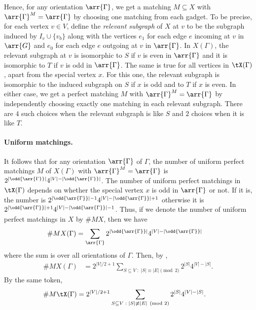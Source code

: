 \documentclass{toc}
\begin{document}
Hence, for any orientation $\arr{\Gamma}$, we get a matching $M \subseteq X$ with
$\arr{\Gamma}^M = \arr{\Gamma}$ by choosing one matching from each gadget. To be precise,
for each vertex $v \in V$, define the \emph{relevant subgraph} of $X$ at $v$ to
be the subgraph induced by $I_v \cup \{v_b\}$ along with the vertices $e_1$ for
each edge $e$ incoming at $v$ in $\arr{G}$ and $e_0$ for each edge $e$ outgoing
at $v$ in $\arr{\Gamma}$. In $X(\Gamma)$, the relevant subgraph at $v$ is isomorphic to
$S$ if $v$ is even in $\arr{\Gamma}$ and it is isomorphic to $T$ if $v$ is odd in
$\arr{\Gamma}$. The same is true for all vertices in $\tX(\Gamma)$, apart from the special
vertex $x$. For this one, the relevant subgraph is isomorphic to the induced subgraph on $S$ if $x$ is
odd and to $T$ if $x$ is even. In either case, we get a perfect matching $M$
with $\arr{\Gamma}^M = \arr{\Gamma}$ by independently choosing exactly one matching in
each relevant subgraph. There are $4$ such choices when the relevant subgraph is
like $S$ and $2$ choices when it is like $T$.

\paragraph{Uniform matchings.}
It follows that for any orientation $\arr{\Gamma}$ of $\Gamma$, the number of uniform
perfect matchings $M$ of $X(\Gamma)$ with $\arr{\Gamma}^M = \arr{\Gamma}$ is
$2^{|\odd{\arr{\Gamma}}|}4^{|V|-|\odd{\arr{\Gamma}}|}$. The number of uniform perfect
matchings in $\tX(\Gamma)$ depends on whether the special vertex $x$ is odd in
$\arr{\Gamma}$ or not. If it is, the number is
$2^{|\odd{\arr{\Gamma}}|-1}4^{|V|-|\odd{\arr{\Gamma}}|+1}$ otherwise it is
$2^{|\odd{\arr{\Gamma}}|+1}4^{|V|-|\odd{\arr{\Gamma}}|-1}$. Thus, if we denote the number
of uniform perfect matchings in $X$ by $\# MX$, then we have
$$
\begin{aligned}
  \# M X(\Gamma) & = \sum_{\arr{\Gamma}} 2^{|\odd{\arr{\Gamma}}|}4^{|V|-|\odd{\arr{\Gamma}}|}
\end{aligned}
$$
where the sum is over all orientations of $\Gamma$. Then, by ,
$$
\begin{aligned}
  \# M X(\Gamma) & = 2^{|V|/2+1}\sum_{S\subseteq V \; : \; |S| \equiv |E| \pmod 2}
  2^{|S|}4^{|V|-|S|}.
\end{aligned}
$$
By the same token,
$$
\begin{aligned}
  \# M \tX(\Gamma) & = 2^{|V|/2+1}\sum_{S\subseteq V\; : \; |S| \not\equiv |E| \pmod
    2} 2^{|S|}4^{|V|-|S|}.
\end{aligned}
$$
\end{document}
